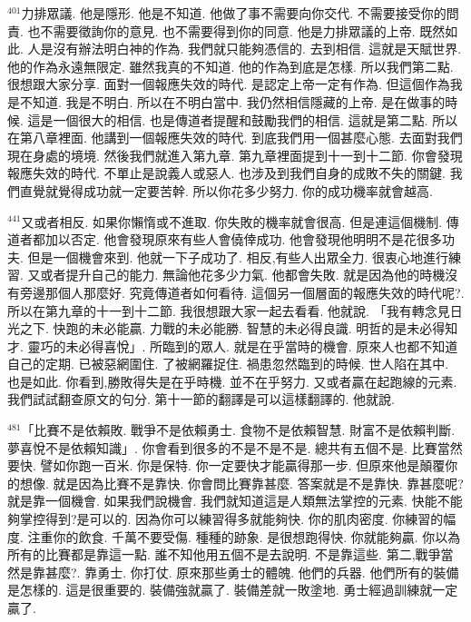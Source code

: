 \documentclass{book}
\begin{document}
$^{401}$力排眾議.
他是隱形.
他是不知道.
他做了事不需要向你交代.
不需要接受你的問責.
也不需要徵詢你的意見.
也不需要得到你的同意.
他是力排眾議的上帝.
既然如此.
人是沒有辦法明白神的作為.
我們就只能夠憑信的.
去到相信.
這就是天賦世界.
他的作為永遠無限定.
雖然我真的不知道.
他的作為到底是怎樣.
所以我們第二點.
很想跟大家分享.
面對一個報應失效的時代.
是認定上帝一定有作為.
但這個作為我是不知道.
我是不明白.
所以在不明白當中.
我仍然相信隱藏的上帝.
是在做事的時候.
這是一個很大的相信.
也是傳道者提醒和鼓勵我們的相信.
這就是第二點.
所以在第八章裡面.
他講到一個報應失效的時代.
到底我們用一個甚麼心態.
去面對我們現在身處的境境.
然後我們就進入第九章.
第九章裡面提到十一到十二節.
你會發現報應失效的時代.
不單止是說義人或惡人.
也涉及到我們自身的成敗不失的關鍵.
我們直覺就覺得成功就一定要苦幹.
所以你花多少努力.
你的成功機率就會越高.

$^{441}$又或者相反.
如果你懶惰或不進取.
你失敗的機率就會很高.
但是連這個機制.
傳道者都加以否定.
他會發現原來有些人會僥倖成功.
他會發現他明明不是花很多功夫.
但是一個機會來到.
他就一下子成功了.
相反,有些人出眾全力.
很衷心地進行練習.
又或者提升自己的能力.
無論他花多少力氣.
他都會失敗.
就是因為他的時機沒有旁邊那個人那麼好.
究竟傳道者如何看待.
這個另一個層面的報應失效的時代呢?.
所以在第九章的十一到十二節.
我很想跟大家一起去看看.
他就說.
「我有轉念見日光之下.
快跑的未必能贏.
力戰的未必能勝.
智慧的未必得良識.
明哲的是未必得知才.
靈巧的未必得喜悅」.
所臨到的眾人.
就是在乎當時的機會.
原來人也都不知道自己的定期.
已被惡網圍住.
了被網羅捉住.
禍患忽然臨到的時候.
世人陷在其中.
也是如此.
你看到,勝敗得失是在乎時機.
並不在乎努力.
又或者贏在起跑線的元素.
我們試試翻查原文的句分.
第十一節的翻譯是可以這樣翻譯的.
他就說.

$^{481}$「比賽不是依賴敗.
戰爭不是依賴勇士.
食物不是依賴智慧.
財富不是依賴判斷.
夢喜悅不是依賴知識」.
你會看到很多的不是不是不是.
總共有五個不是.
比賽當然要快.
譬如你跑一百米.
你是保特.
你一定要快才能贏得那一步.
但原來他是顛覆你的想像.
就是因為比賽不是靠快.
你會問比賽靠甚麼.
答案就是不是靠快.
靠甚麼呢?就是靠一個機會.
如果我們說機會.
我們就知道這是人類無法掌控的元素.
快能不能夠掌控得到?是可以的.
因為你可以練習得多就能夠快.
你的肌肉密度.
你練習的幅度.
注重你的飲食.
千萬不要受傷.
種種的跡象.
是很想跑得快.
你就能夠贏.
你以為所有的比賽都是靠這一點.
誰不知他用五個不是去說明.
不是靠這些.
第二,戰爭當然是靠甚麼?.
靠勇士.
你打仗.
原來那些勇士的體魄.
他們的兵器.
他們所有的裝備是怎樣的.
這是很重要的.
裝備強就贏了.
裝備差就一敗塗地.
勇士經過訓練就一定贏了.
\end{document}
